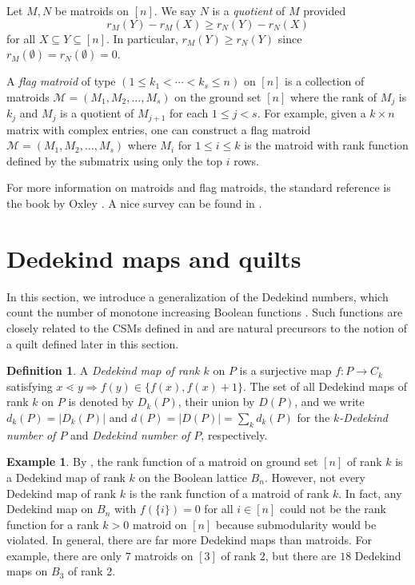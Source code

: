 \documentclass[12pt]{amsart}
\numberwithin{equation}{section}
\theoremstyle{definition}
\newtheorem{defin}[theorem]{Definition}
\newtheorem{example}[theorem]{Example}
\begin{document}
Let $M,N$ be matroids on $[n]$.  We say $N$ is a \emph{quotient} of
$M$ provided
\begin{equation}\label{eq:flag.matroid.rank.inequality}
r_M(Y)-r_M(X)\geq r_N(Y)-r_N(X)
\end{equation}
for all $X\subseteq Y \subseteq [n]$.  In particular, $r_M(Y)\geq r_N(Y)$ since
$r_M(\emptyset) = r_N(\emptyset)=0$.

A \emph{flag matroid} of type $(1\leq k_{1}<\cdots <
k_{s}\leq n)$ on $[n]$ is a collection of matroids
$\mathcal{M}=(M_{1}, M_{2},\dots , M_{s})$ on the ground set $[n]$
where the rank of $M_{j}$ is $k_{j}$ and $M_{j}$ is a quotient of
$M_{j+1}$ for each $1\leq j<s$.  For example, given a $k \times n$
matrix with complex entries, one can construct a flag matroid $\mathcal{M}=(M_{1}, M_{2},\dots , M_{s})$ where
$M_{i}$ for $1\leq i\leq k$ is the matroid with rank function defined by
the submatrix using only the top $i$ rows.

For more information on matroids and flag matroids, the standard
reference is the book by Oxley \cite{Oxley}.  A nice survey can be
found in \cite{CAMERON.DINU.MICHALEK.SEYNNAEVE}.

\section{Dedekind maps and quilts} \label{sec:def}

In this section, we introduce a generalization of the Dedekind
numbers, which count the number of monotone increasing Boolean
functions \cite[A000372]{oeis}.  Such functions are closely related to
the CSMs defined in  and are natural precursors to the
notion of a quilt defined later in this section.


\begin{defin}\label{def:Dedekin.map}
A \emph{Dedekind map of rank $k$} on $P$ is a surjective map $f \colon
P \to C_k$ satisfying $x \lessdot y \Rightarrow f(y) \in
\{f(x),f(x)+1\}$.  The set of all Dedekind maps of rank $k$ on $P$ is
denoted by $D_k(P)$, their union by $D(P)$, and we write $d_k(P) =
|D_k(P)|$ and $d(P) = |D(P)| = \sum_k d_k(P)$ for the \emph{$k$-Dedekind number
of $P$} and \emph{Dedekind number of $P$}, respectively.
\end{defin}

\begin{example}\label{ex:matroid.dedekind}
By , the rank function of a matroid on
ground set $[n]$ of rank $k$ is a Dedekind map of rank $k$ on the
Boolean lattice $B_{n}$.  However, not every Dedekind map of rank $k$
is the rank function of a matroid of rank $k$.  In fact, any Dedekind
map on $B_{n}$ with $f(\{i\})=0$ for all $i\in [n]$ could not be the
rank function for a rank $k>0$ matroid on $[n]$ because submodularity
would be violated.  In general, there are far more Dedekind maps than
matroids. For example, there are only $7$ matroids on $[3]$ of rank
$2$, but there are $18$ Dedekind maps on $B_{3}$ of rank 2.
\end{example}
\end{document}

